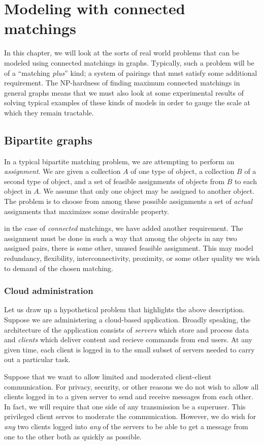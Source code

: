\chapter{Modeling with connected matchings}

In this chapter, we will look at the sorts of real world problems that can be modeled using connected matchings in graphs.  Typically, such a problem will be of a ``matching {\it plus}'' kind; a system of pairings that must satisfy some additional requirement.  The NP-hardness of finding maximum connected matchings in general graphs means that we must also look at some experimental results of solving typical examples of these kinds of models in order to gauge the scale at which they remain tractable.
    
	
\section{Bipartite graphs}
	In a typical bipartite matching problem, we are attempting to perform an {\it assignment}.  We are given a collection $A$ of one type of object, a collection $B$ of a second type of object, and a set of feasible assignments
of objects from $B$ to each object in $A$.  We assume that only one object may be assigned to another object.  The problem is to choose from among these possible assignments a set of {\it actual} assignments that maximizes some desirable property.
	
	in the case of {\it connected} matchings, we have added another requirement.  The assignment must be done in such a way that among the objects in any two assigned pairs, there is some other, unused feasible assignment.  This may model redundancy, flexibility, interconnectivity, proximity, or some other quality we wish to demand of the chosen matching.   
	\subsection{Cloud administration}

	Let us draw up a hypothetical problem that highlights the above description.  Suppose we are administering a cloud-based application. Broadly speaking, the architecture of the application consists of {\it servers} which store and process data and {\it clients} which deliver content and recieve commands from end users.  At any given time, each client is logged in to the small subset of servers needed to carry out a particular task.

Suppose that we want to allow limited and moderated client-client communication.  For privacy, security, or other reasons we do not wish to allow all clients logged in to a given server to send and receive messages from each other.  In fact, we will require that one side of any transmission be a superuser.   This privileged client serves to moderate the communication.  However, we do wish for {\it any} two clients logged into {\it any} of the servers to be able to get a message from one to the other both as quickly as possible. 

